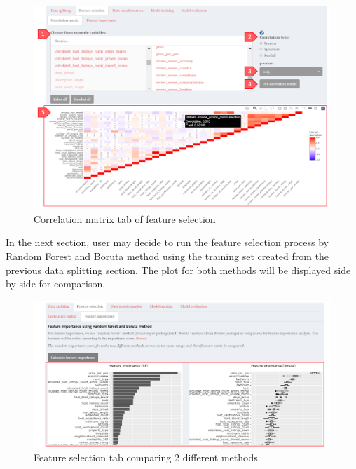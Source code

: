 \documentclass[
  12pt,
]{article}
\begin{document}
\begin{figure}[H]

{\centering \includegraphics[width=0.95\linewidth]{images/corrmatrix} 

}

\caption{Correlation matrix tab of feature selection}\label{fig:unnamed-chunk-12}
\end{figure}

In the next section, user may decide to run the feature selection
process by Random Forest and Boruta method using the training set
created from the previous data splitting section. The plot for both
methods will be displayed side by side for comparison.

\begin{figure}[H]

{\centering \includegraphics[width=0.95\linewidth]{images/featureselect} 

}

\caption{Feature selection tab comparing 2 different methods}\label{fig:unnamed-chunk-13}
\end{figure}
\end{document}
